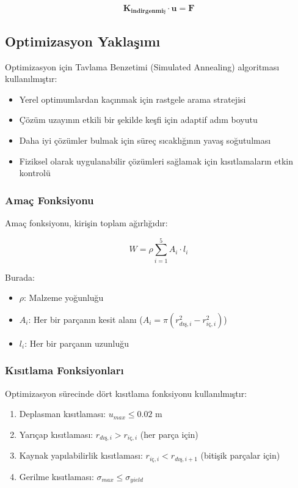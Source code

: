 \begin{equation}
\mathbf{K_{indirgenmiş}} \cdot \mathbf{u} = \mathbf{F}
\end{equation}

\subsection{Optimizasyon Yaklaşımı}
Optimizasyon için Tavlama Benzetimi (Simulated Annealing) algoritması kullanılmıştır:

\begin{itemize}
    \item Yerel optimumlardan kaçınmak için rastgele arama stratejisi
    \item Çözüm uzayının etkili bir şekilde keşfi için adaptif adım boyutu
    \item Daha iyi çözümler bulmak için süreç sıcaklığının yavaş soğutulması
    \item Fiziksel olarak uygulanabilir çözümleri sağlamak için kısıtlamaların etkin kontrolü
\end{itemize}

\subsubsection{Amaç Fonksiyonu}
Amaç fonksiyonu, kirişin toplam ağırlığıdır:

\begin{equation}
W = \rho \sum_{i=1}^{5} A_i \cdot l_i
\end{equation}

Burada:
\begin{itemize}
    \item $\rho$: Malzeme yoğunluğu
    \item $A_i$: Her bir parçanın kesit alanı ($A_i = \pi(r_{dış,i}^2 - r_{iç,i}^2)$)
    \item $l_i$: Her bir parçanın uzunluğu
\end{itemize}

\subsubsection{Kısıtlama Fonksiyonları}
Optimizasyon sürecinde dört kısıtlama fonksiyonu kullanılmıştır:

\begin{enumerate}
    \item Deplasman kısıtlaması: $u_{max} \leq 0.02$ m
    \item Yarıçap kısıtlaması: $r_{dış,i} > r_{iç,i}$ (her parça için)
    \item Kaynak yapılabilirlik kısıtlaması: $r_{iç,i} < r_{dış,i+1}$ (bitişik parçalar için)
    \item Gerilme kısıtlaması: $\sigma_{max} \leq \sigma_{yield}$
\end{enumerate}

